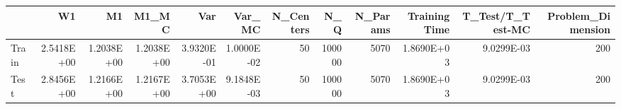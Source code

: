 \begin{tabular}{lrrrrrrrrrrr}
\toprule
{} &         W1 &         M1 &      M1\_MC &        Var &     Var\_MC &  N\_Centers &     N\_Q &  N\_Params &  Training Time &  T\_Test/T\_Test-MC &  Problem\_Dimension \\
\midrule
Train & 2.5418E+00 & 1.2038E+00 & 1.2038E+00 & 3.9320E-01 & 1.0000E-02 &         50 &  100000 &      5070 &     1.8690E+03 &        9.0299E-03 &                200 \\
Test  & 2.8456E+00 & 1.2166E+00 & 1.2167E+00 & 3.7053E+00 & 9.1848E-03 &         50 &  100000 &      5070 &     1.8690E+03 &        9.0299E-03 &                200 \\
\bottomrule
\end{tabular}
